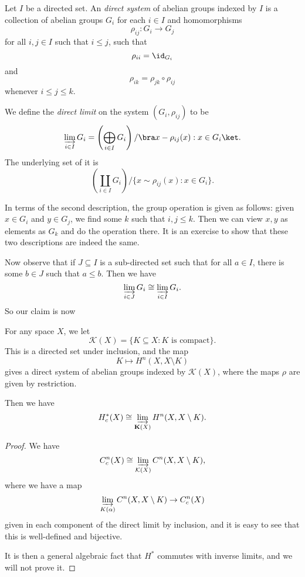 \documentclass[a4paper]{article}
\begin{document}
\begin{defi}
  Let $I$ be a directed set. An \emph{direct system} of abelian groups indexed by $I$ is a collection of abelian groups $G_i$ for each $i \in I$ and homomorphisms
  \[
    \rho_{ij}: G_i \to G_j
  \]
  for all $i, j \in I$ such that $i \leq j$, such that
  \[
    \rho_{ii} = \id_{G_i}
  \]
  and
  \[
    \rho_{ik} = \rho_{jk} \circ \rho_{ij}
  \]
  whenever $i \leq j \leq k$.

  We define the \emph{direct limit} on the system $(G_i, \rho_{ij})$ to be
  \[
    \varinjlim_{i \in I} G_i = \left(\bigoplus_{i \in I} G_i\right)/\bra x - \rho_{ij}(x): x \in G_i\ket.
  \]
  The underlying set of it is
  \[
    \left(\coprod_{i \in I}G_i\right)/\{x \sim \rho_{ij}(x): x \in G_i\}.
  \]
\end{defi}
In terms of the second description, the group operation is given as follows: given $x \in G_i$ and $y \in G_j$, we find some $k$ such that $i, j \leq k$. Then we can view $x, y$ as elements as $G_k$ and do the operation there. It is an exercise to show that these two descriptions are indeed the same.

Now observe that if $J \subseteq I$ is a sub-directed set such that for all $a \in I$, there is some $b \in J$ such that $a \leq b$. Then we have
\[
  \varinjlim_{i \in J} G_i \cong \varinjlim_{i \in I} G_i.
\]
So our claim is now
\begin{thm}
  For any space $X$, we let
  \[
    \mathcal{K}(X) = \{K \subseteq X: K\text{ is compact}\}.
  \]
  This is a directed set under inclusion, and the map
  \[
    K \mapsto H^n(X, X \setminus K)
  \]
  gives a direct system of abelian groups indexed by $\mathcal{K}(X)$, where the maps $\rho$ are given by restriction.

  Then we have
  \[
    H^*_c(X) \cong \varinjlim_{\mathbf{K}(X)} H^n(X, X \setminus K).
  \]
\end{thm}

\begin{proof}
  We have
  \[
    C_c^n(X) \cong \varinjlim_{\mathcal{K}(X)} C^n(X, X \setminus K),
  \]
  where we have a map
  \[
     \varinjlim_{K(\alpha)} C^n(X, X \setminus K)\to C_c^n(X)
  \]
  given in each component of the direct limit by inclusion, and it is easy to see that this is well-defined and bijective.

  It is then a general algebraic fact that $H^*$ commutes with inverse limits, and we will not prove it.
\end{proof}
\end{document}
